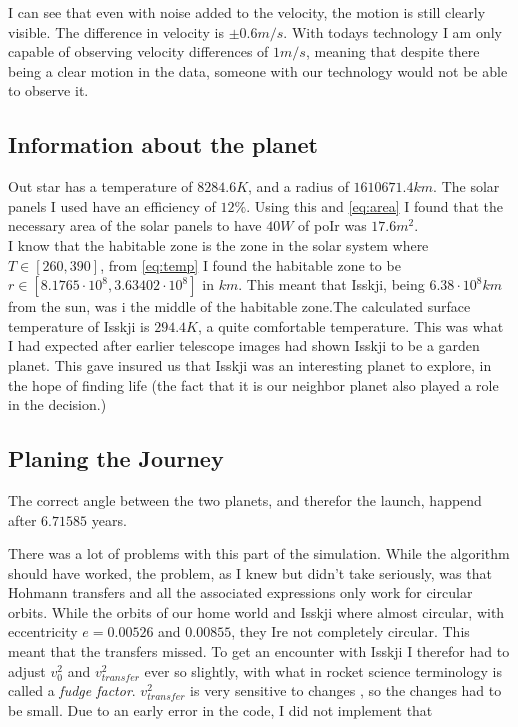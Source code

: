 \documentclass[a4paper, 10pt]{article}
\begin{document}
I can see that even with noise added to the velocity, the motion is still clearly visible. The difference in velocity is $\pm 0.6 m/s$. With todays technology I am only capable of observing velocity differences of $1 m/s$, meaning that despite there being a clear motion in the data, someone with our technology would not be able to observe it.




\subsection{Information about the planet}
Out star has a temperature of $8284.6 K$, and a radius of $1610671.4 km$. The solar panels I used have an efficiency of $12\%$. Using this and \ref{eq:area} I found that the necessary area of the solar panels to have $40W$ of poIr was   $17.6 m^2$. \\

I know that the habitable zone is the zone in the solar system where $T \in [260,390]$, from \ref{eq:temp} I found the habitable zone to be $r \in [8.1765\cdot 10^8,3.63402\cdot 10^8]$ in $km$. This meant that Isskji, being $6.38 \cdot 10^8 km$ from the sun, was i the middle of the habitable zone.The calculated surface temperature of Isskji is $294.4 K$, a quite comfortable temperature. This was what I had expected after earlier telescope images had shown Isskji to be a garden planet. This gave insured us that Isskji was an interesting planet to explore, in the hope of finding life (the fact that it is our neighbor planet also played a role in the decision.) 

\subsection{Planing the Journey}

The correct angle between the two planets, and therefor the launch, happend after $6.71585$ years.

There was a lot of problems with this part of the simulation. While the algorithm should have worked, the problem, as I knew but didn't take seriously, was that Hohmann transfers and all the associated expressions only work for circular orbits. While the orbits of our home world and Isskji where almost circular, with eccentricity $e = 0.00526$ and $0.00855$, they Ire not completely circular. This meant that the transfers missed. To get an encounter with Isskji I therefor had to adjust $v_0^2$ and $v_{transfer}^2$ ever so slightly, with what in rocket science terminology is called a \textit{fudge factor}. $v_{transfer}^2$ is very sensitive to changes \cite{SpaceDynamics}, so the changes had to be small. Due to an early error in the code, I did not implement that
\end{document}
